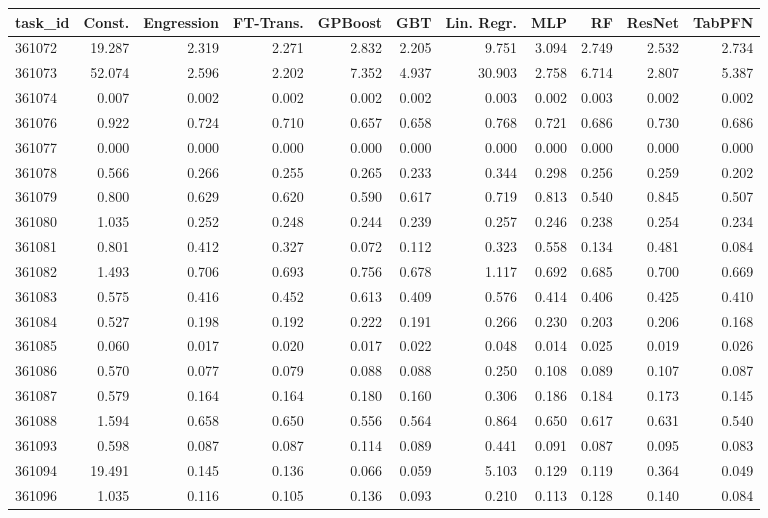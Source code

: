 \begin{tabular}{lrrrrrrrrrr}
\toprule
task\_id & Const. & Engression & FT-Trans. & GPBoost & GBT & Lin. Regr. & MLP & RF & ResNet & TabPFN \\
\midrule
361072 & 19.287 & 2.319 & 2.271 & 2.832 & 2.205 & 9.751 & 3.094 & 2.749 & 2.532 & 2.734 \\
361073 & 52.074 & 2.596 & 2.202 & 7.352 & 4.937 & 30.903 & 2.758 & 6.714 & 2.807 & 5.387 \\
361074 & 0.007 & 0.002 & 0.002 & 0.002 & 0.002 & 0.003 & 0.002 & 0.003 & 0.002 & 0.002 \\
361076 & 0.922 & 0.724 & 0.710 & 0.657 & 0.658 & 0.768 & 0.721 & 0.686 & 0.730 & 0.686 \\
361077 & 0.000 & 0.000 & 0.000 & 0.000 & 0.000 & 0.000 & 0.000 & 0.000 & 0.000 & 0.000 \\
361078 & 0.566 & 0.266 & 0.255 & 0.265 & 0.233 & 0.344 & 0.298 & 0.256 & 0.259 & 0.202 \\
361079 & 0.800 & 0.629 & 0.620 & 0.590 & 0.617 & 0.719 & 0.813 & 0.540 & 0.845 & 0.507 \\
361080 & 1.035 & 0.252 & 0.248 & 0.244 & 0.239 & 0.257 & 0.246 & 0.238 & 0.254 & 0.234 \\
361081 & 0.801 & 0.412 & 0.327 & 0.072 & 0.112 & 0.323 & 0.558 & 0.134 & 0.481 & 0.084 \\
361082 & 1.493 & 0.706 & 0.693 & 0.756 & 0.678 & 1.117 & 0.692 & 0.685 & 0.700 & 0.669 \\
361083 & 0.575 & 0.416 & 0.452 & 0.613 & 0.409 & 0.576 & 0.414 & 0.406 & 0.425 & 0.410 \\
361084 & 0.527 & 0.198 & 0.192 & 0.222 & 0.191 & 0.266 & 0.230 & 0.203 & 0.206 & 0.168 \\
361085 & 0.060 & 0.017 & 0.020 & 0.017 & 0.022 & 0.048 & 0.014 & 0.025 & 0.019 & 0.026 \\
361086 & 0.570 & 0.077 & 0.079 & 0.088 & 0.088 & 0.250 & 0.108 & 0.089 & 0.107 & 0.087 \\
361087 & 0.579 & 0.164 & 0.164 & 0.180 & 0.160 & 0.306 & 0.186 & 0.184 & 0.173 & 0.145 \\
361088 & 1.594 & 0.658 & 0.650 & 0.556 & 0.564 & 0.864 & 0.650 & 0.617 & 0.631 & 0.540 \\
361093 & 0.598 & 0.087 & 0.087 & 0.114 & 0.089 & 0.441 & 0.091 & 0.087 & 0.095 & 0.083 \\
361094 & 19.491 & 0.145 & 0.136 & 0.066 & 0.059 & 5.103 & 0.129 & 0.119 & 0.364 & 0.049 \\
361096 & 1.035 & 0.116 & 0.105 & 0.136 & 0.093 & 0.210 & 0.113 & 0.128 & 0.140 & 0.084 \\

\end{tabular}
